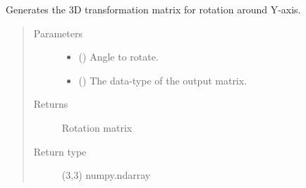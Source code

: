 \documentclass[letterpaper,10pt,english]{sphinxmanual}
\begin{document}

\begin{fulllineitems}
\label{\detokenize{modules/dpt_tools:dpt_tools.rot_mat_y}}
Generates the 3D transformation matrix for rotation around Y-axis.
\begin{quote}\begin{description}
\item[{Parameters}] \leavevmode\begin{itemize}
\item {} 
 () \textendash{} Angle to rotate.

\item {} 
 () \textendash{} The data-type of the output matrix.

\end{itemize}

\item[{Returns}] \leavevmode
Rotation matrix

\item[{Return type}] \leavevmode
(3,3) numpy.ndarray

\end{description}\end{quote}

\end{fulllineitems}

\end{document}
